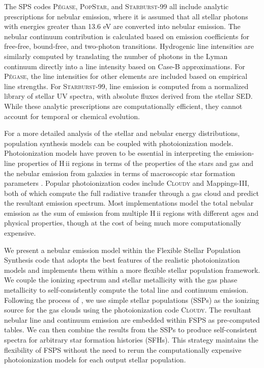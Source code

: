 \documentclass[linenumbers, trackchanges, tighten]{aastex61}%
\newcommand{\FSPS}{{\sc FSPS}\xspace}
\newcommand{\Mappings}{{\sc Mappings-III}\xspace}
\newcommand{\Pegase}{\textsc{P{\'e}gase}\xspace}
\newcommand{\SB}{\textsc{Starburst-99}\xspace}
\newcommand{\Popstar}{\textsc{PopStar}\xspace}
\newcommand{\Cloudy}{\textsc{Cloudy}\xspace}
\newcommand{\hii}{H\,{\sc ii}\xspace}
\begin{document}
The SPS codes \Pegase \citep{Fioc99}, \Popstar \citep{Molla09}, and \SB \citep{Leitherer99} all include analytic prescriptions for nebular emission, where it is assumed that all stellar photons with energies greater than 13.6 eV are converted into nebular emission. The nebular continuum contribution is calculated based on emission coefficients for free-free, bound-free, and two-photon transitions. Hydrogenic line intensities are similarly computed by translating the number of photons in the Lyman continuum directly into a line intensity based on Case-B approximations. For \Pegase, the line intensities for other elements are included based on empirical line strengths. For \SB, line emission is computed from a normalized library of stellar UV spectra, with absolute fluxes derived from the stellar SED. While these analytic prescriptions are computationally efficient, they cannot account for temporal or chemical evolution.

For a more detailed analysis of the stellar and nebular energy distributions, population synthesis models can be coupled with photoionization models. Photoionization models have proven to be essential in interpreting the emission-line properties of \hii regions in terms of the properties of the stars and gas \citep[e.g.,][]{Dopita00} and the nebular emission from galaxies in terms of macroscopic star formation parameters \citep[e.g.,][]{Brinchmann04}. Popular photoionization codes include \Cloudy \citep{Ferland13} and \Mappings \citep{Groves04}, both of which compute the full radiative transfer through a gas cloud and predict the resultant emission spectrum. Most implementations model the total nebular emission as the sum of emission from multiple \hii regions with different ages and physical properties, though at the cost of being much more computationally expensive\citep[e.g.,][]{Kewley01, Moy01, CL01, Dopita06}.

We present a nebular emission model within the Flexible Stellar Population Synthesis code \citep[\FSPS\footnote{available on GitHub \url{https://github.com/cconroy20/fsps}},][]{Conroy09} that adopts the best features of the realistic photoionization models and implements them within a more flexible stellar population framework. We couple the ionizing spectrum and stellar metallicity with the gas phase metallicity to self-consistently compute the total line and continuum emission. Following the process of \citet{CL01}, we use simple stellar populations (SSPs) as the ionizing source for the gas clouds using the photoionization code \Cloudy{}. The resultant nebular line and continuum emission are embedded within \FSPS as pre-computed tables. We can then combine the results from the SSPs to produce self-consistent spectra for arbitrary star formation histories (SFHs). This strategy maintains the flexibility of \FSPS without the need to rerun the computationally expensive photoionization models for each output stellar population.
\end{document}
